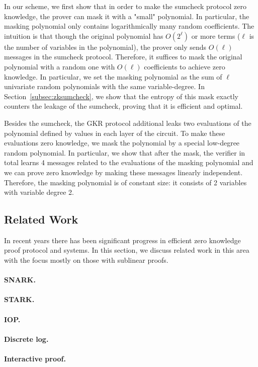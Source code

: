 In our scheme, we first show that in order to make the sumcheck protocol zero knowledge, the prover can mask it with a "small" polynomial. In particular, the masking polynomial only contains logarithmically many random coefficients. The intuition is that though the original polynomial has $O(2^\ell)$ or more terms ($\ell$ is the number of variables in the polynomial), the prover only sends $O(\ell)$ messages in the sumcheck protocol. Therefore, it suffices to mask the original polynomial with a random one with $O(\ell)$ coefficients to achieve zero knowledge. In particular, we set the masking polynomial as the sum of $\ell$ univariate random polynomials with the same variable-degree. In Section~\ref{subsec:zksumcheck}, we show that the entropy of this mask exactly counters the leakage of the sumcheck, proving that it is efficient and optimal.

Besides the sumcheck, the GKR protocol additional leaks two evaluations of the polynomial defined by values in each layer of the circuit. To make these evaluations zero knowledge, we mask the polynomial by a special low-degree random polynomial. In particular, we show that after the mask, the verifier in total learns 4 messages related to the evaluations of the masking polynomial and we can prove zero knowledge by making these messages linearly independent. Therefore, the masking polynomial is of constant size: it consists of 2 variables with variable degree 2.


\subsection{Related Work} In recent years there has been significant progress in efficient zero knowledge proof protocol and systems. In this section, we discuss related work in this area with the focus mostly on those with sublinear proofs. 

\paragraph{SNARK.}

\paragraph{STARK.}

\paragraph{IOP.}

\paragraph{Discrete log.}

\paragraph{Interactive proof.}

